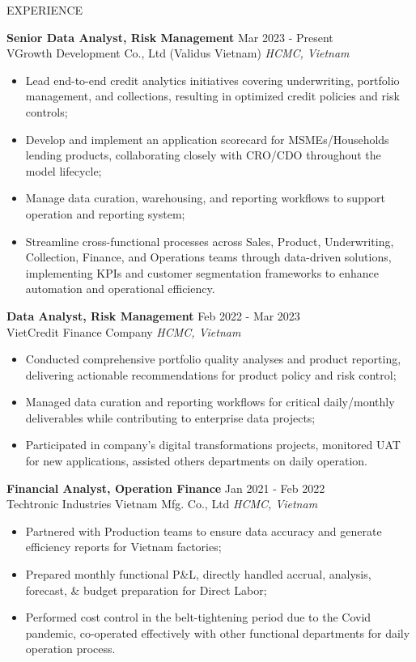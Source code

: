 \documentclass{resume} %
\begin{document}
\begin{rSection}{EXPERIENCE}

\textbf{Senior Data Analyst, Risk Management} \hfill Mar 2023 - Present\\
VGrowth Development Co., Ltd (Validus Vietnam) \hfill \textit{HCMC, Vietnam}
 \begin{itemize}
    \itemsep -3pt {} 
     \item Lead end-to-end credit analytics initiatives covering underwriting, portfolio management, and collections, resulting in optimized credit policies and risk controls;
     \item Develop and implement an application scorecard for MSMEs/Households lending products, collaborating closely with CRO/CDO throughout the model lifecycle;
     \item Manage data curation, warehousing, and reporting workflows to support operation and reporting system;
     \item Streamline cross-functional processes across Sales, Product, Underwriting, Collection, Finance, and Operations teams through data-driven solutions, implementing KPIs and customer segmentation frameworks to enhance automation and operational efficiency.
 \end{itemize}
 
\textbf{Data Analyst, Risk Management} \hfill Feb 2022 - Mar 2023\\
VietCredit Finance Company \hfill \textit{HCMC, Vietnam}
 \begin{itemize}
    \itemsep -3pt {} 
     \item Conducted comprehensive portfolio quality analyses and product reporting, delivering actionable recommendations for product policy and risk control;
     \item Managed data curation and reporting workflows for critical daily/monthly deliverables while contributing to enterprise data projects;
     \item Participated in company’s digital transformations projects, monitored UAT for new applications, assisted others departments on daily operation.
 \end{itemize}

\textbf{Financial Analyst, Operation Finance} \hfill Jan 2021 - Feb 2022\\
Techtronic Industries Vietnam Mfg. Co., Ltd \hfill \textit{HCMC, Vietnam}
 \begin{itemize}
    \itemsep -3pt {} 
     \item Partnered with Production teams to ensure data accuracy and generate efficiency reports for Vietnam factories;
     \item Prepared monthly functional P\&L, directly handled accrual, analysis, forecast, \& budget preparation for Direct Labor;
     \item Performed cost control in the belt-tightening period due to the Covid pandemic, co-operated effectively with other functional departments for daily operation process.
 \end{itemize}


\end{rSection}
\end{document}
